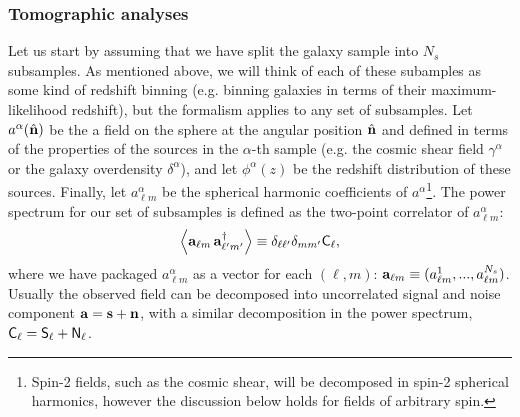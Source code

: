 \documentclass[twocolumn,amsfont,amssymb,amsmath, showpacs,balancelastpage, nofootinbib]{revtex4-1}
\newcommand{\nv}{\hat{\bf n}}
\begin{document}
    \subsubsection{Tomographic analyses}\label{sssec:method.tomographic.st}
      Let us start by assuming that we have split the galaxy sample into $N_s$ subsamples. As mentioned above, we will think of each of these subamples as some kind of redshift binning (e.g. binning galaxies in terms of their maximum-likelihood redshift), but the formalism applies to any set of subsamples. Let $a^\alpha(\nv)$ be the a field on the sphere at the angular position $\nv$ and defined in terms of the properties of the sources in the $\alpha$-th sample (e.g. the cosmic shear field $\gamma^\alpha$ or the galaxy overdensity $\delta^\alpha$), and let $\phi^\alpha(z)$ be the redshift distribution of these sources. Finally, let $a^\alpha_{\ell m}$ be the spherical harmonic coefficients of $a^\alpha$\footnote{Spin-2 fields, such as the cosmic shear, will be decomposed in spin-2 spherical harmonics, however the discussion below holds for fields of arbitrary spin.}. The power spectrum for our set of subsamples is defined as the two-point correlator of $a^\alpha_{\ell m}$:
      \begin{equation}
        \left\langle {\bf a}_{\ell m}\,{\bf a}^\dag_{\ell' m'} \right\rangle\equiv\delta_{\ell\ell'}\delta_{mm'}{\sf C}_\ell,
      \end{equation}
      where we have packaged $a^\alpha_{\ell m}$ as a vector for each $(\ell,m)$: ${\bf a}_{\ell m}\equiv(a^1_{\ell m},...,a^{N_s}_{\ell m})$. Usually the observed field can be decomposed into uncorrelated signal and noise component ${\bf a}={\bf s}+{\bf n}$, with a similar decomposition in the power spectrum, ${\sf C}_\ell={\sf S}_\ell+{\sf N}_\ell$.
  
\end{document}
